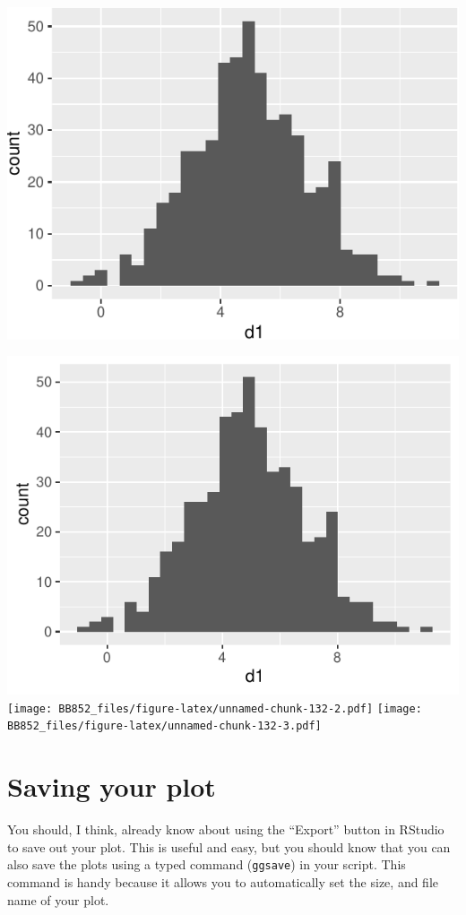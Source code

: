 \documentclass[
  a4paperpaper,
]{book}
\begin{document}
\includegraphics{BB852_files/figure-latex/unnamed-chunk-131-1.pdf}

\includegraphics{BB852_files/figure-latex/unnamed-chunk-132-1.pdf} \texttt{[image: BB852\_files/figure-latex/unnamed-chunk-132-2.pdf]} \texttt{[image: BB852\_files/figure-latex/unnamed-chunk-132-3.pdf]}

\hypertarget{saving-your-plot}{%
\section{Saving your plot}\label{saving-your-plot}}

You should, I think, already know about using the ``Export'' button in RStudio to save out your plot. This is useful and easy, but you should know that you can also save the plots using a typed command (\texttt{ggsave}) in your script. This command is handy because it allows you to automatically set the size, and file name of your plot.
\end{document}

